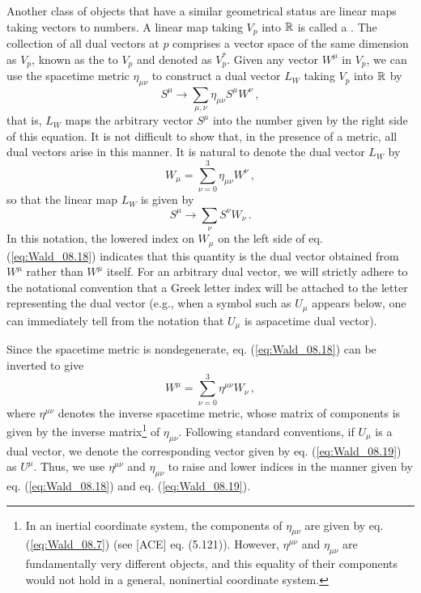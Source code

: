 Another class of objects that have a similar geometrical status are linear maps taking vectors to numbers. A linear map taking $V_p$ into $\mathbb{R}$ is called a . The collection of all dual vectors at $p$ comprises a vector space of the same dimension as $V_p$, known as the  to $V_p$ and denoted as $V^*_p$. Given any vector $W^\mu$ in $V_p$, we can use the spacetime metric $\eta_{\mu\nu}$ to construct a dual vector $L_W$ taking $V_p$ into $\mathbb{R}$ by
\begin{equation}\label{eq:Wald_08.17}
S^\mu \longrightarrow \sum_{\mu,\nu}\eta_{\mu\nu} S^\mu W^\nu\,,
\end{equation}
that is, $L_W$ maps the arbitrary vector $S^\mu$ into the number given by the right side of this equation. It is not difficult to show that, in the presence of a metric, all dual vectors arise in this manner. It is natural to denote the dual vector $L_W$ by  
\begin{equation}\label{eq:Wald_08.18}
W_\mu = \sum_{\nu=0}^3 \eta_{\mu\nu} W^\nu\,,
\end{equation}
so that the linear map $L_W$ is given by $$S^\mu \longrightarrow \sum_\nu S^\nu W_\nu\,.$$
In this notation, the lowered index on $W_\mu$ on the left side of eq. (\ref{eq:Wald_08.18}) indicates that this quantity is the dual vector obtained from $W^\mu$ rather than $W^\mu$ itself. For an arbitrary dual vector, we will strictly adhere to the notational convention that a  Greek letter index will be attached to the letter representing the dual vector (e.g., when a symbol such as $U_\mu$ appears below, one can immediately tell from the notation that $U_\mu$ is aspacetime dual vector).

Since the spacetime metric is nondegenerate, eq. (\ref{eq:Wald_08.18}) can be inverted to give 
\begin{equation}\label{eq:Wald_08.19}
W^\mu = \sum_{\nu=0}^3 \eta^{\mu\nu} W_\nu\,,
\end{equation}
where $\eta^{\mu\nu}$ denotes the inverse spacetime metric, whose matrix of components is given by the inverse matrix\footnote{In an inertial coordinate system, the components of $\eta_{\mu\nu}$ are given by eq. (\ref{eq:Wald_08.7}) (see [ACE] eq. (5.121)). However, $\eta^{\mu\nu}$ and $\eta_{\mu\nu}$ are fundamentally very different objects, and this equality of their components would not hold in a general, noninertial coordinate system.} of $\eta_{\mu\nu}$. Following standard conventions, if $U_\mu$ is a dual vector, we denote the corresponding vector given by eq. (\ref{eq:Wald_08.19}) as $U^\mu$. Thus, we use $\eta^{\mu\nu}$ and $\eta_{\mu\nu}$ to raise and lower indices in the manner given by eq. (\ref{eq:Wald_08.18}) and eq. (\ref{eq:Wald_08.19}).

